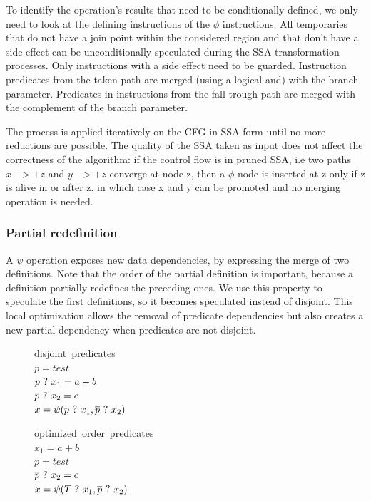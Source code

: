 To identify the operation's results that need to be conditionally defined, we only need to look at the defining instructions of the $\phi$ instructions. All temporaries that do not have a join point within the considered region and that don't have a side effect can be unconditionally speculated during the SSA transformation processes. Only instructions with a side effect need to be guarded. 
Instruction predicates from the taken path are merged (using a logical and) with the branch parameter. Predicates in instructions from the fall trough path are merged with the complement of the branch parameter.

The process is applied iteratively on the CFG in SSA form until no more reductions are possible. The quality of the SSA taken as input does not affect the correctness of the algorithm: if the control flow is in pruned SSA, i.e two paths $x->+z$ and $y->+z$ converge at node z, then a $\phi$ node is inserted at z only if z is alive in or after z. in which case x and y can be promoted and no merging operation is needed. 

\subsubsection{Partial redefinition}

A $\psi$ operation exposes new data dependencies, by expressing the merge of two definitions. Note that the order of the partial definition is important, because a definition partially redefines the preceding ones. We use this property to speculate the first definitions, so it becomes speculated instead of disjoint. This local optimization allows the removal of predicate dependencies but also creates a new partial dependency when predicates are not disjoint. 

\begin{figure}
\footnotesize
\begin{minipage}[t]{4cm}
\mbox{disjoint predicates} \\
$ p = test $ \\
$ p ~?~ x_1 = a + b $ \\
$ \overline{p} ~?~ x_2 = c $ \\
$ x = \psi(p ~?~ x_1, \overline{p} ~?~ x_2) $ \\
\end{minipage}
\begin{minipage}[t]{4cm}
\mbox{optimized order predicates} \\
$ x_1 = a + b $ \\
$ p = test $ \\
$ \overline{p} ~?~ x_2 = c $ \\
$ x = \psi(T ~?~ x_1, \overline{p} ~?~ x_2) $ \\
\end{minipage}
\end{figure}

